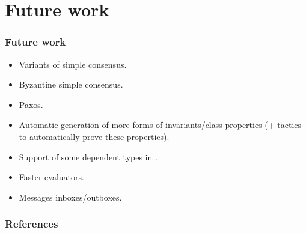 \documentclass[12pt,red]{beamer}
\begin{document}
\section{Future work}


\begin{frame}
  \frametitle{Future work}

  \begin{itemize}
  \item Variants of simple consensus.
  \item Byzantine simple consensus.
  \item Paxos.
  \item Automatic generation of more forms of invariants/class
    properties (+ tactics to automatically prove these properties).
  \item Support of some dependent types in \eml.
  \item Faster evaluators.
  \item Messages inboxes/outboxes.
  \end{itemize}
\end{frame}


\begin{frame}[allowframebreaks]
  \frametitle{References}
  \begin{tiny}
    
  \end{tiny}
\end{frame}
\end{document}
